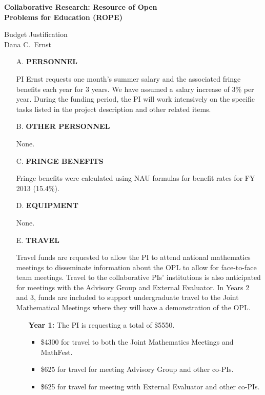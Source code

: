 \documentclass[11pt]{article}
\begin{document}
\begin{center}
{\Large \textbf{Collaborative Research: Resource of Open\\
Problems for Education (ROPE)}}

\bigskip

{\Large Budget Justification}\\
\smallskip
Dana C.~Ernst
\end{center}

\begin{enumerate}[leftmargin=*]

\item[A.] \textbf{PERSONNEL}

PI Ernst requests one month's summer salary and the associated fringe benefits each year for 3 years. We have assumed a salary increase of 3\% per year.  During the funding period, the PI will work intensively on the specific tasks listed in the project description and other related items. \hfill {}

\item[B.] \textbf{OTHER PERSONNEL}

None. \hfill {}

\item[C.] \textbf{FRINGE BENEFITS}

Fringe benefits were calculated using NAU formulas for benefit rates for FY 2013 (15.4\%).

\hfill {}

\item[D.] \textbf{EQUIPMENT}

None. \hfill {}

\item[E.] \textbf{TRAVEL}

Travel funds are requested to allow the PI to attend national mathematics meetings to disseminate information about the OPL to allow for face-to-face team meetings.  Travel to the collaborative PIs' institutions is also anticipated for meetings with the Advisory Group and External Evaluator. In Years 2 and 3, funds are included to support undergraduate travel to the Joint Mathematical Meetings where they will have a demonstration of the OPL.

\begin{enumerate}
\item[] \textbf{Year 1:} The PI is requesting a total of \$5550.
\begin{itemize}
\item \$4300 for travel to both the Joint Mathematics Meetings and MathFest.
\item \$625 for travel for meeting Advisory Group and other co-PIs.
\item \$625 for travel for meeting with External Evaluator and other co-PIs.
\end{itemize}


\end{enumerate}
\end{enumerate}
\end{document}
